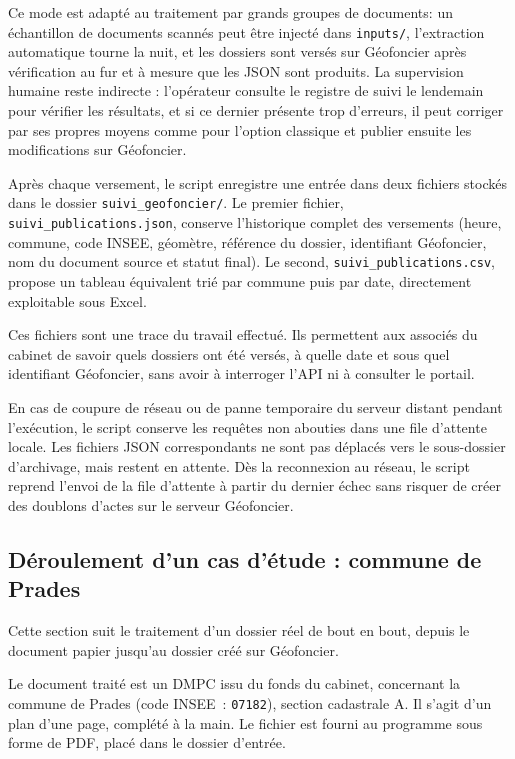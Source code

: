 Ce mode est adapté au traitement par grands groupes de documents: un échantillon de documents scannés peut être injecté dans \texttt{inputs/}, l'extraction automatique tourne la nuit, et les dossiers sont versés sur Géofoncier après vérification au fur et à mesure que les JSON sont produits. La supervision humaine reste indirecte : l'opérateur consulte le registre de suivi le lendemain pour vérifier les résultats, et si ce dernier présente trop d'erreurs, il peut corriger par ses propres moyens comme pour l'option classique et publier ensuite les modifications sur Géofoncier.

Après chaque versement, le script enregistre une entrée dans deux fichiers stockés dans le dossier \texttt{suivi\_geofoncier/}. Le premier fichier, \texttt{suivi\_publications.json}, conserve l'historique complet des versements (heure, commune, code INSEE, géomètre, référence du dossier, identifiant Géofoncier, nom du document source et statut final). Le second, \texttt{suivi\_publications.csv}, propose un tableau équivalent trié par commune puis par date, directement exploitable sous Excel.

Ces fichiers sont une trace du travail effectué. Ils permettent aux associés du cabinet de savoir  quels dossiers ont été versés, à quelle date et sous quel identifiant Géofoncier, sans avoir à interroger l'API ni à consulter le portail.

En cas de coupure de réseau ou de panne temporaire du serveur distant pendant l'exécution, le script conserve les requêtes non abouties dans une file d'attente locale. Les fichiers JSON correspondants ne sont pas déplacés vers le sous-dossier d'archivage, mais restent en attente. Dès la reconnexion au réseau, le script reprend l'envoi de la file d'attente à partir du dernier échec sans risquer de créer des doublons d'actes sur le serveur Géofoncier.


\subsection{Déroulement d'un cas d'étude : commune de Prades}

Cette section suit le traitement d'un dossier réel de bout en bout, depuis le document papier jusqu'au dossier créé sur Géofoncier.

Le document traité est un DMPC issu du fonds du cabinet, concernant la commune de Prades (code INSEE~: \texttt{07182}), section cadastrale A. Il s'agit d'un plan d'une page, complété à la main. Le fichier est fourni au programme sous forme de PDF, placé dans le dossier d'entrée.

